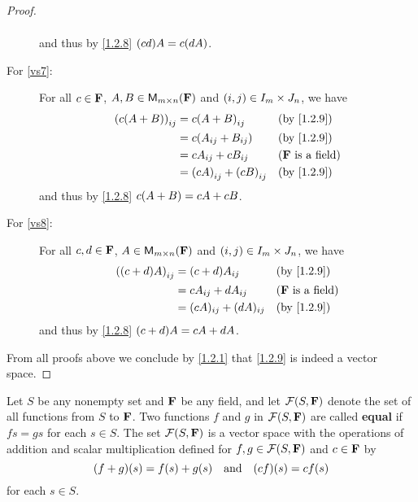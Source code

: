 \begin{proof}
\begin{description}
\begin{align*}
            \end{align*}
            and thus by \cref{1.2.8} \(\p{cd} A = c \p{dA}\).
        \item[For \ref{vs7}:]
            For all \(c \in \mathbf{F}\), \(A, B \in {{\mathsf{M}_{{m} \times n}({\mathbf{F}})}}\) and \(\left\lparen i, j\right\rparen \in I_{m} \times J_{n}\), we have
            \begin{align*}
                \p{c \p{A + B}}_{i j} & = c \p{A + B}_{i j}           &  & \text{(by \cref{1.2.9})}   \\
                                      & = c \p{A_{i j} + B_{i j}}     &  & \text{(by \cref{1.2.9})}   \\
                                      & = c A_{i j} + c B_{i j}       &  & \text{(\(\F\) is a field)} \\
                                      & = \p{cA}_{i j} + \p{cB}_{i j} &  & \text{(by \cref{1.2.9})}
            \end{align*}
            and thus by \cref{1.2.8} \(c \p{A + B} = cA + cB\).
        \item[For \ref{vs8}:]
            For all \(c, d \in \mathbf{F}\), \(A \in {{\mathsf{M}_{{m} \times n}({\mathbf{F}})}}\) and \(\left\lparen i, j\right\rparen \in I_{m} \times J_{n}\), we have
            \begin{align*}
                \p{\p{c + d} A}_{i j} & = \p{c + d} A_{i j}       &  & \text{(by \cref{1.2.9})}   \\
                                      & = c A_{i j} + d A_{i j}   &  & \text{(\(\F\) is a field)} \\
                                      & = (cA)_{i j} + (dA)_{i j} &  & \text{(by \cref{1.2.9})}
            \end{align*}
            and thus by \cref{1.2.8} \(\p{c + d} A = cA + dA\).
    \end{description}
    From all proofs above we conclude by \cref{1.2.1} that \cref{1.2.9} is indeed a vector space.
\end{proof}

\begin{eg}\label{1.2.10}
    Let \(S\) be any nonempty set and \(\mathbf{F}\) be any field, and let \(\FS\) denote the set of all functions from \(S\) to \(\mathbf{F}\).
    Two functions \(f\) and \(g\) in \(\FS\) are called \textbf{equal} if \(f{s} = g{s}\) for each \(s \in S\).
    The set \(\FS\) is a vector space with the operations of addition and scalar multiplication defined for \(f, g \in \FS\) and \(c \in \mathbf{F}\) by
    \[
        \p{f + g}\p{s} = f\p{s} + g\p{s} \quad \text{and} \quad \p{cf}\p{s} = cf\p{s}
    \]
    for each \(s \in S\).
\end{eg}

